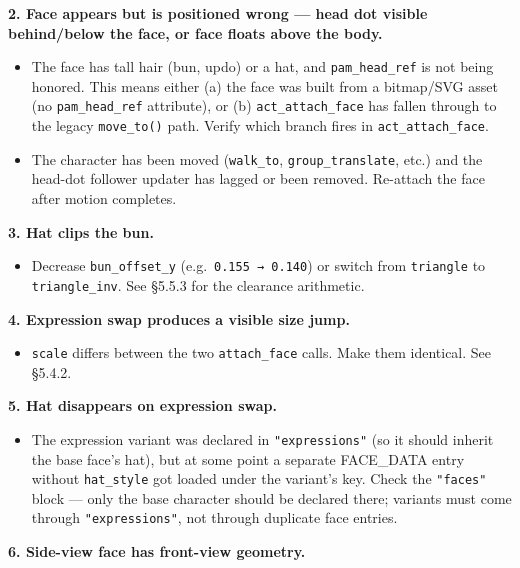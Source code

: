 \documentclass[
  12pt,
  letterpaper,
]{book}
\providecommand{\tightlist}{%
  \setlength{\itemsep}{0pt}\setlength{\parskip}{0pt}}
\begin{document}
\textbf{2. Face appears but is positioned wrong --- head dot visible
behind/below the face, or face floats above the body.}

\begin{itemize}
\tightlist
\item
  The face has tall hair (bun, updo) or a hat, and
  \texttt{pam\_head\_ref} is not being honored. This means either (a)
  the face was built from a bitmap/SVG asset (no \texttt{pam\_head\_ref}
  attribute), or (b) \texttt{act\_attach\_face} has fallen through to
  the legacy \texttt{move\_to()} path. Verify which branch fires in
  \texttt{act\_attach\_face}.
\item
  The character has been moved (\texttt{walk\_to},
  \texttt{group\_translate}, etc.) and the head-dot follower updater has
  lagged or been removed. Re-attach the face after motion completes.
\end{itemize}

\textbf{3. Hat clips the bun.}

\begin{itemize}
\tightlist
\item
  Decrease \texttt{bun\_offset\_y} (e.g.~\texttt{0.155\ →\ 0.140}) or
  switch from \texttt{triangle} to \texttt{triangle\_inv}. See §5.5.3
  for the clearance arithmetic.
\end{itemize}

\textbf{4. Expression swap produces a visible size jump.}

\begin{itemize}
\tightlist
\item
  \texttt{scale} differs between the two \texttt{attach\_face} calls.
  Make them identical. See §5.4.2.
\end{itemize}

\textbf{5. Hat disappears on expression swap.}

\begin{itemize}
\tightlist
\item
  The expression variant was declared in \texttt{"expressions"} (so it
  should inherit the base face's hat), but at some point a separate
  FACE\_DATA entry without \texttt{hat\_style} got loaded under the
  variant's key. Check the \texttt{"faces"} block --- only the base
  character should be declared there; variants must come through
  \texttt{"expressions"}, not through duplicate face entries.
\end{itemize}

\textbf{6. Side-view face has front-view geometry.}
\end{document}
